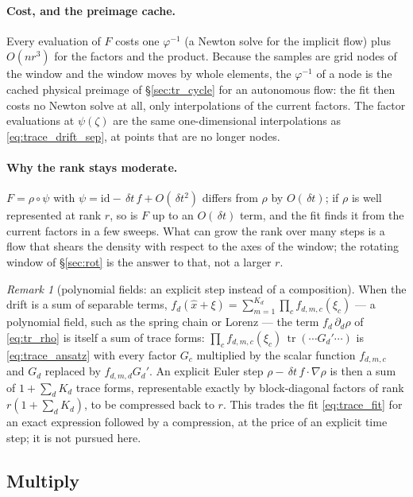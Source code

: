 \documentclass[11pt,a4paper]{article}
\newcommand{\tr}{\operatorname{tr}}
\newcommand{\xh}{\hat{x}}
\newcommand{\grad}{\nabla}
\newcommand{\dt}{\,\delta t}
\theoremstyle{plain}
\theoremstyle{definition}
\theoremstyle{remark}
\newtheorem{remark}{Remark}
\begin{document}
\paragraph{Cost, and the preimage cache.}
Every evaluation of $F$ costs one $\varphi^{-1}$ (a Newton solve for the implicit flow) plus $O(nr^3)$ for the factors and the product. Because the samples are grid nodes of the window and the window moves by whole elements, the $\varphi^{-1}$ of a node is the cached physical preimage of \S\ref{sec:tr_cycle} for an autonomous flow: the fit then costs no Newton solve at all, only interpolations of the current factors. The factor evaluations at $\psi(\zeta)$ are the same one-dimensional interpolations as \eqref{eq:trace_drift_sep}, at points that are no longer nodes.

\paragraph{Why the rank stays moderate.}
$F=\rho\circ\psi$ with $\psi=\mathrm{id}-\dt\,f+O(\dt^2)$ differs from $\rho$ by $O(\dt)$; if $\rho$ is well represented at rank $r$, so is $F$ up to an $O(\dt)$ term, and the fit finds it from the current factors in a few sweeps. What can grow the rank over many steps is a flow that shears the density with respect to the axes of the window; the rotating window of \S\ref{sec:rot} is the answer to that, not a larger $r$.

\begin{remark}[polynomial fields: an explicit step instead of a composition]
When the drift is a sum of separable terms, $f_d(\xh+\xi)=\sum_{m=1}^{K_d}\prod_cf_{d,m,c}(\xi_c)$ --- a polynomial field, such as the spring chain or Lorenz --- the term $f_d\,\partial_d\rho$ of \eqref{eq:tr_rho} is itself a sum of trace forms: $\prod_cf_{d,m,c}(\xi_c)\,\tr(\cdots G_d'\cdots)$ is \eqref{eq:trace_ansatz} with every factor $G_c$ multiplied by the scalar function $f_{d,m,c}$ and $G_d$ replaced by $f_{d,m,d}G_d'$. An explicit Euler step $\rho-\dt\,f\cdot\grad\rho$ is then a sum of $1+\sum_dK_d$ trace forms, representable exactly by block-diagonal factors of rank $r(1+\sum_dK_d)$, to be compressed back to $r$. This trades the fit \eqref{eq:trace_fit} for an exact expression followed by a compression, at the price of an explicit time step; it is not pursued here.
\end{remark}

\subsection{Multiply}
\end{document}
